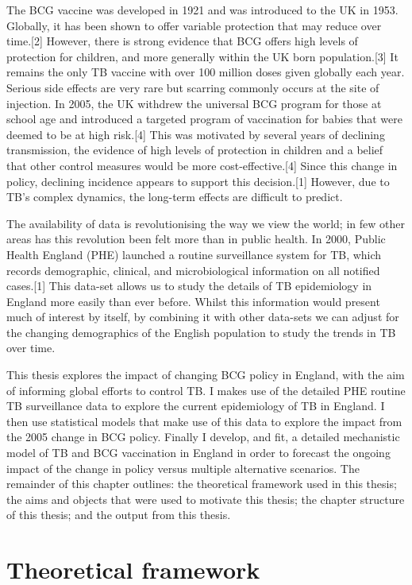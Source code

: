 \documentclass[11pt,twoside]{bristolthesis}
\begin{document}
  The BCG vaccine was developed in 1921 and was introduced to the UK in 1953. Globally, it has been shown to offer variable protection that may reduce over time.{[}2{]} However, there is strong evidence that BCG offers high levels of protection for children, and more generally within the UK born population.{[}3{]} It remains the only TB vaccine with over 100 million doses given globally each year. Serious side effects are very rare but scarring commonly occurs at the site of injection. In 2005, the UK withdrew the universal BCG program for those at school age and introduced a targeted program of vaccination for babies that were deemed to be at high risk.{[}4{]} This was motivated by several years of declining transmission, the evidence of high levels of protection in children and a belief that other control measures would be more cost-effective.{[}4{]} Since this change in policy, declining incidence appears to support this decision.{[}1{]} However, due to TB's complex dynamics, the long-term effects are difficult to predict.
  
  The availability of data is revolutionising the way we view the world; in few other areas has this revolution been felt more than in public health. In 2000, Public Health England (PHE) launched a routine surveillance system for TB, which records demographic, clinical, and microbiological information on all notified cases.{[}1{]} This data-set allows us to study the details of TB epidemiology in England more easily than ever before. Whilst this information would present much of interest by itself, by combining it with other data-sets we can adjust for the changing demographics of the English population to study the trends in TB over time.
  
  This thesis explores the impact of changing BCG policy in England, with the aim of informing global efforts to control TB. I makes use of the detailed PHE routine TB surveillance data to explore the current epidemiology of TB in England. I then use statistical models that make use of this data to explore the impact from the 2005 change in BCG policy. Finally I develop, and fit, a detailed mechanistic model of TB and BCG vaccination in England in order to forecast the ongoing impact of the change in policy versus multiple alternative scenarios. The remainder of this chapter outlines: the theoretical framework used in this thesis; the aims and objects that were used to motivate this thesis; the chapter structure of this thesis; and the output from this thesis.
  
  \hypertarget{theoretical-framework}{%
  \section{Theoretical framework}\label{theoretical-framework}}
  
\end{document}
